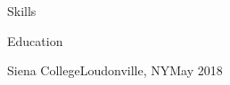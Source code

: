 \documentclass[]{xjavathehutt}
\begin{document}
\begin{cvsection}{Skills}
  \printskills
\end{cvsection}

\begin{cvsection}{Education}
  \begin{cvsubsection}{Siena College}{Loudonville, NY}{May 2018}
  \end{cvsubsection}
\end{cvsection}

\end{document}
